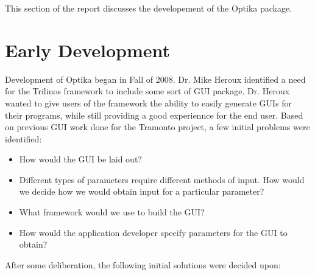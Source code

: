 This section of the report discusses the developement of the Optika package.

\section{Early Development}
Development of Optika began in Fall of 2008. Dr. Mike Heroux identified a need for
the Trilinos framework to include some sort of GUI package. Dr. Heroux wanted 
to give users of the framework the ability to easily generate GUIs for their
programs, while still providing a good experiennce for the end user. Based on
previous GUI work done for the Tramonto project, a few initial problems were
identified:
	\begin{itemize}
		\item How would the GUI be laid out?
		\item Different types of parameters require different methods of input.
			How would we decide how we would obtain input for a particular
			parameter?
		\item What framework would we use to build the GUI?
		\item How would the application developer specify parameters for the
			GUI to obtain?
	\end{itemize}
After some deliberation, the following initial solutions were decided upon:
